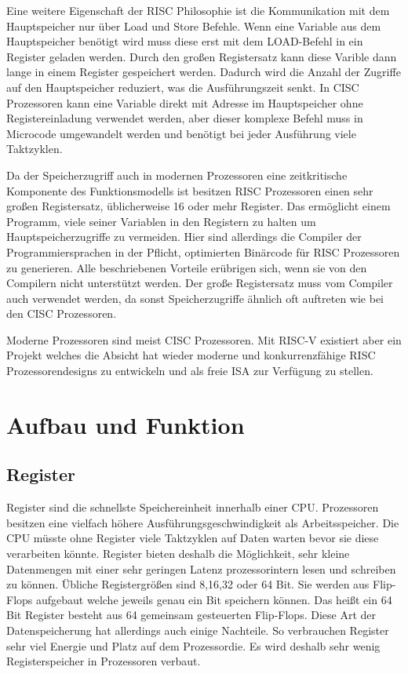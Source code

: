 \documentclass[12pt]{article}
\begin{document}
\noindent Eine weitere Eigenschaft der RISC Philosophie ist die Kommunikation mit dem Hauptspeicher nur über Load und Store Befehle. Wenn eine Variable aus dem Hauptspeicher benötigt wird muss diese erst mit dem LOAD-Befehl in ein Register geladen werden. Durch den großen Registersatz kann diese Varible dann lange in einem Register gespeichert werden. Dadurch wird die Anzahl der Zugriffe auf den Hauptspeicher reduziert, was die Ausführungszeit senkt. In CISC Prozessoren kann eine Variable direkt mit Adresse im Hauptspeicher ohne Registereinladung verwendet werden, aber dieser komplexe Befehl muss in Microcode umgewandelt werden und benötigt bei jeder Ausführung viele Taktzyklen.\cite[S.102]{mikroprozessortechnik2011}

\par \bigskip
\noindent Da der Speicherzugriff auch in modernen Prozessoren eine zeitkritische Komponente des Funktionsmodells ist besitzen RISC Prozessoren einen sehr großen Registersatz, üblicherweise 16 oder mehr Register. Das ermöglicht einem Programm, viele seiner Variablen in den Registern zu halten um Hauptspeicherzugriffe zu vermeiden. Hier sind allerdings die Compiler der Programmiersprachen in der Pflicht, optimierten Binärcode für RISC Prozessoren zu generieren. Alle beschriebenen Vorteile erübrigen sich, wenn sie von den Compilern nicht unterstützt werden. Der große Registersatz muss vom Compiler auch verwendet werden, da sonst Speicherzugriffe ähnlich oft auftreten wie bei den CISC Prozessoren. \cite[S.102]{mikroprozessortechnik2011}
\par \bigskip
\noindent Moderne Prozessoren sind meist CISC Prozessoren. Mit RISC-V existiert aber ein Projekt welches die Absicht hat wieder moderne und konkurrenzfähige RISC Prozessorendesigns zu entwickeln und als freie ISA zur Verfügung zu stellen. 

\newpage
\section{Aufbau und Funktion}
\subsection{Register} \label{sub:register}
Register sind die schnellste Speichereinheit innerhalb einer CPU. Prozessoren besitzen eine vielfach höhere Ausführungsgeschwindigkeit als Arbeitsspeicher. Die CPU müsste ohne Register viele Taktzyklen auf Daten warten bevor sie diese verarbeiten könnte. Register bieten deshalb die Möglichkeit, sehr kleine Datenmengen mit einer sehr geringen Latenz prozessorintern lesen und schreiben zu können. Übliche Registergrößen sind 8,16,32 oder 64 Bit.\cite{mikroprozessortechnik2011} Sie werden aus Flip-Flops aufgebaut welche jeweils genau ein Bit speichern können. Das heißt ein 64 Bit Register besteht aus 64 gemeinsam gesteuerten Flip-Flops.\cite{mikroprozessortechnik2011} Diese Art der Datenspeicherung hat allerdings auch einige Nachteile. So verbrauchen Register sehr viel Energie und Platz auf dem Prozessordie. Es wird deshalb sehr wenig Registerspeicher in Prozessoren verbaut.
\end{document}
